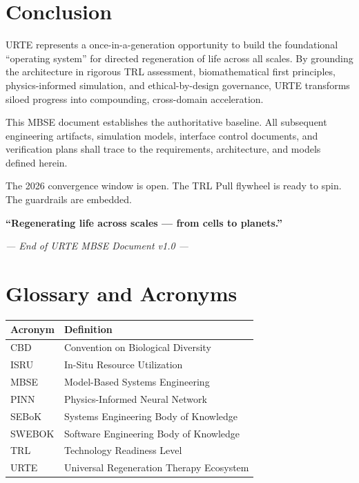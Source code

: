 \documentclass[11pt,a4paper]{report}
\begin{document}
\chapter{Conclusion}

URTE represents a once-in-a-generation opportunity to build the foundational ``operating system'' for directed regeneration of life across all scales. By grounding the architecture in rigorous TRL assessment, biomathematical first principles, physics-informed simulation, and ethical-by-design governance, URTE transforms siloed progress into compounding, cross-domain acceleration.

This MBSE document establishes the authoritative baseline. All subsequent engineering artifacts, simulation models, interface control documents, and verification plans shall trace to the requirements, architecture, and models defined herein.

The 2026 convergence window is open. The TRL Pull flywheel is ready to spin. The guardrails are embedded.

\textbf{``Regenerating life across scales --- from cells to planets.''}

\vspace{1cm}
\begin{center}
\textit{--- End of URTE MBSE Document v1.0 ---}
\end{center}

\appendix

\chapter{Glossary and Acronyms}

\begin{tabular}{ll}
\toprule
\textbf{Acronym} & \textbf{Definition} \\
\midrule
CBD & Convention on Biological Diversity \\
ISRU & In-Situ Resource Utilization \\
MBSE & Model-Based Systems Engineering \\
PINN & Physics-Informed Neural Network \\
SEBoK & Systems Engineering Body of Knowledge \\
SWEBOK & Software Engineering Body of Knowledge \\
TRL & Technology Readiness Level \\
URTE & Universal Regeneration Therapy Ecosystem \\
\bottomrule
\end{tabular}
\end{document}
